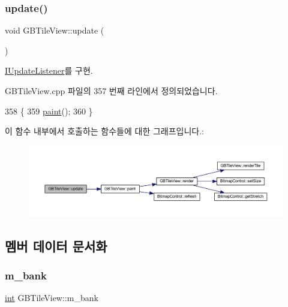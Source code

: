 \subsubsection{\texorpdfstring{update()}{update()}}
{\footnotesize\ttfamily void G\+B\+Tile\+View\+::update (\begin{DoxyParamCaption}{ }\end{DoxyParamCaption})\hspace{0.3cm}{\ttfamily [virtual]}}



\mbox{\hyperlink{class_i_update_listener_ac03b85f52e858d0bbd08a4984b2cb929}{I\+Update\+Listener}}를 구현.



G\+B\+Tile\+View.\+cpp 파일의 357 번째 라인에서 정의되었습니다.


\begin{DoxyCode}
358 \{
359   \mbox{\hyperlink{class_g_b_tile_view_aa78a471956e777509644a0a04bab2c4d}{paint}}();
360 \}
\end{DoxyCode}
이 함수 내부에서 호출하는 함수들에 대한 그래프입니다.\+:
\nopagebreak
\begin{figure}[H]
\begin{center}
\leavevmode
\includegraphics[width=350pt]{class_g_b_tile_view_a0b36c27b43fea0e457a26860b2476b9d_cgraph}
\end{center}
\end{figure}


\subsection{멤버 데이터 문서화}
\mbox{\label{class_g_b_tile_view_a765264072397d9630d2f3ae8e58c414e}} 
\subsubsection{\texorpdfstring{m\+\_\+bank}{m\_bank}}
{\footnotesize\ttfamily \mbox{\hyperlink{_util_8cpp_a0ef32aa8672df19503a49fab2d0c8071}{int}} G\+B\+Tile\+View\+::m\+\_\+bank}



